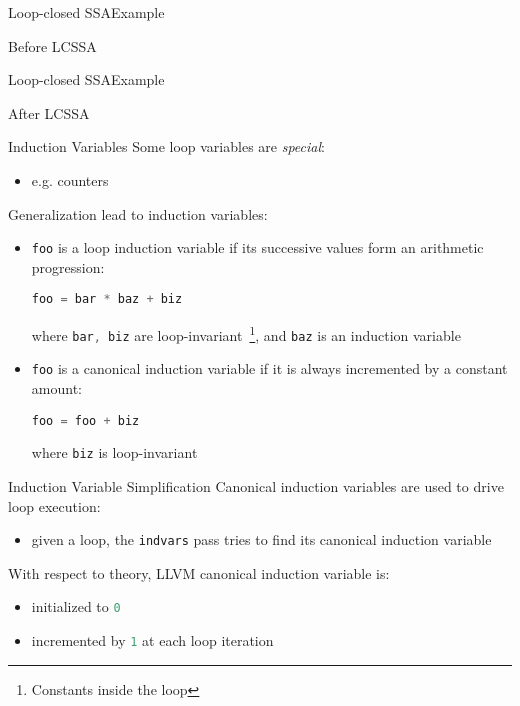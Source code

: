 \documentclass[10pt,mathserif]{beamer}
\newcommand{\cinline}[1]{\lstinline[language=C]!#1!}
\newcommand{\llvminput}[1]{}
\newcommand{\llvminline}[1]{\lstinline[language=LLVM]!#1!}
\begin{document}
\begin{frame}{Loop-closed SSA}{Example}
\begin{block}{Before LCSSA}
\centering
\llvminput{snippet/02/before-lcssa.ll}
\end{block}
\end{frame}

\begin{frame}{Loop-closed SSA}{Example}
\begin{block}{After LCSSA}
\centering
\llvminput{snippet/02/after-lcssa.ll}
\end{block}
\end{frame}

\begin{frame}{Induction Variables}
Some loop variables are \emph{special}:

\begin{itemize}
\item e.g. counters
\end{itemize}

Generalization lead to \alert{induction variables}:

\begin{itemize}
\item \cinline{foo} is a loop induction variable if its successive values form
      an arithmetic progression:

      \begin{center}
      \cinline{foo = bar * baz + biz}
      \end{center}

      where \cinline{bar, biz} are
      loop-invariant~\footnote{Constants inside the loop}, and \cinline{baz} is
      an induction variable
\item \cinline{foo} is a \alert{canonical} induction variable if it is always
      incremented by a constant amount:

      \begin{center}
      \cinline{foo = foo + biz}
      \end{center}

      where \cinline{biz} is loop-invariant
\end{itemize}
\end{frame}

\begin{frame}{Induction Variable Simplification}
Canonical induction variables are used to \alert{drive} loop execution:

\begin{itemize}
\item given a loop, the \texttt{indvars} pass tries to find its canonical
      induction variable
\end{itemize}

With respect to theory, LLVM canonical induction variable is:

\begin{itemize}
\item initialized to \llvminline{0}
\item incremented by \llvminline{1} at each loop iteration
\end{itemize}
\end{frame}
\end{document}
